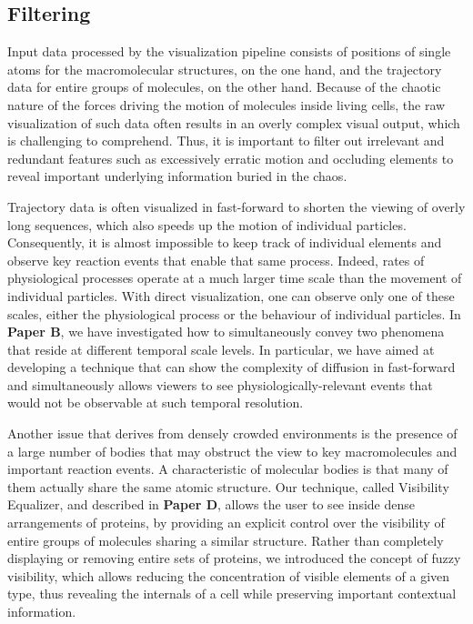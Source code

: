 \subsection{Filtering}

Input data processed by the visualization pipeline consists of positions of single atoms for the macromolecular structures, on the one hand, and the trajectory data for entire groups of molecules, on the other hand.
Because of the chaotic nature of the forces driving the motion of molecules inside living cells, the raw visualization of such data often results in an overly complex visual output, which is challenging to comprehend.
Thus, it is important to filter out irrelevant and redundant features such as excessively erratic motion and occluding elements to reveal important underlying information buried in the chaos.

Trajectory data is often visualized in fast-forward to shorten the viewing of overly long sequences, which also speeds up the motion of individual particles.
Consequently, it is almost impossible to keep track of individual elements and observe key reaction events that enable that same process. 
Indeed, rates of physiological processes operate at a much larger time scale than the movement of individual particles.
With direct visualization, one can observe only one of these scales, either the physiological process or the behaviour of individual particles.
In \textbf{Paper B}, we have investigated how to simultaneously convey two phenomena that reside at different temporal scale levels. 
In particular, we have aimed at developing a technique that can show the complexity of diffusion in fast-forward and simultaneously allows viewers to see physiologically-relevant events that would not be observable at such temporal resolution.

Another issue that derives from densely crowded environments is the presence of a large number of bodies that may obstruct the view to key macromolecules and important reaction events. 
A characteristic of molecular bodies is that many of them actually share the same atomic structure.
Our technique, called Visibility Equalizer, and described in \textbf{Paper D}, allows the user to see inside dense arrangements of proteins, by providing an explicit control over the visibility of entire groups of molecules sharing a similar structure. 
Rather than completely displaying or removing entire sets of proteins, we introduced the concept of fuzzy visibility, which allows reducing the concentration of visible elements of a given type, thus revealing the internals of a cell while preserving important contextual information.

